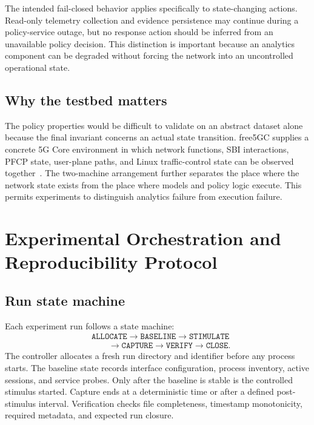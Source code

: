 \documentclass[sigconf,review]{acmart}
\begin{document}
The intended fail-closed behavior applies specifically to state-changing actions. Read-only telemetry collection and evidence persistence may continue during a policy-service outage, but no response action should be inferred from an unavailable policy decision. This distinction is important because an analytics component can be degraded without forcing the network into an uncontrolled operational state.

\subsection{Why the testbed matters}
The policy properties would be difficult to validate on an abstract dataset alone because the final invariant concerns an actual state transition. free5GC supplies a concrete 5G Core environment in which network functions, SBI interactions, PFCP state, user-plane paths, and Linux traffic-control state can be observed together~\cite{free5gc,free5gcdocs}. The two-machine arrangement further separates the place where the network state exists from the place where models and policy logic execute. This permits experiments to distinguish analytics failure from execution failure.

\section{Experimental Orchestration and Reproducibility Protocol}
\subsection{Run state machine}
Each experiment run follows a state machine:
\begin{equation*}
\begin{aligned}
&\texttt{ALLOCATE}\rightarrow\texttt{BASELINE}\rightarrow\texttt{STIMULATE}\\[-1mm]
&\qquad\rightarrow\texttt{CAPTURE}\rightarrow\texttt{VERIFY}\rightarrow\texttt{CLOSE}.
\end{aligned}
\end{equation*}
The controller allocates a fresh run directory and identifier before any process starts. The baseline state records interface configuration, process inventory, active sessions, and service probes. Only after the baseline is stable is the controlled stimulus started. Capture ends at a deterministic time or after a defined post-stimulus interval. Verification checks file completeness, timestamp monotonicity, required metadata, and expected run closure.
\end{document}

